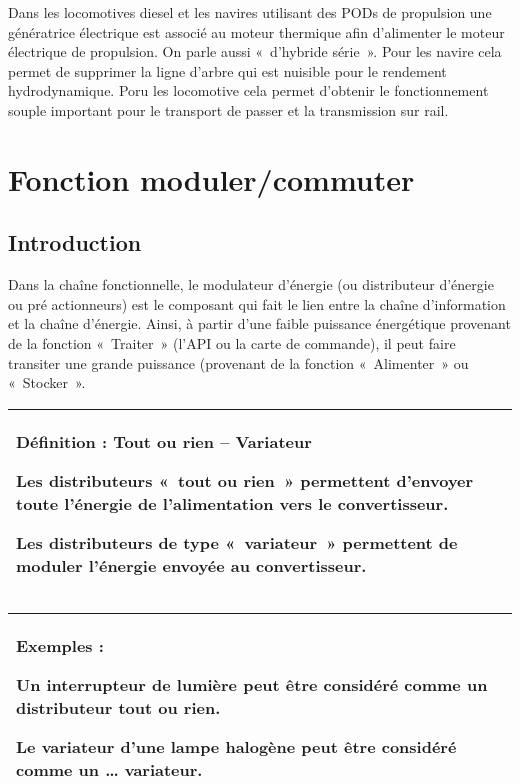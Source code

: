 \documentclass[
]{article}
\begin{document}
Dans les locomotives diesel et les navires utilisant des PODs de
propulsion une génératrice électrique est associé au moteur thermique
afin d'alimenter le moteur électrique de propulsion. On parle aussi
«~d'hybride série~». Pour les navire cela permet de supprimer la ligne
d'arbre qui est nuisible pour le rendement hydrodynamique. Poru les
locomotive cela permet d'obtenir le fonctionnement souple important pour
le transport de passer et la transmission sur rail.

\hypertarget{fonction-modulercommuter}{%
\section{Fonction moduler/commuter}\label{fonction-modulercommuter}}

\hypertarget{introduction}{%
\subsection{Introduction}\label{introduction}}

Dans la chaîne fonctionnelle, le modulateur d'énergie (ou distributeur
d'énergie ou pré actionneurs) est le composant qui fait le lien entre la
chaîne d'information et la chaîne d'énergie. Ainsi, à partir d'une
faible puissance énergétique provenant de la fonction «~Traiter~» (l'API
ou la carte de commande), il peut faire transiter une grande puissance
(provenant de la fonction «~Alimenter~» ou «~Stocker~».

\begin{longtable}[]{@{}
  >{\raggedright\arraybackslash}p{}@{}}
\toprule
\endhead
\textbf{Définition : Tout ou rien -- Variateur}

Les distributeurs «~tout ou rien~» permettent d'envoyer toute l'énergie
de l'alimentation vers le convertisseur.

Les distributeurs de type «~variateur~» permettent de moduler l'énergie
envoyée au convertisseur. \\
\bottomrule
\end{longtable}

\begin{longtable}[]{@{}
  >{\raggedright\arraybackslash}p{}@{}}
\toprule
\endhead
\textbf{Exemples :}

Un interrupteur de lumière peut être considéré comme un distributeur
tout ou rien.

Le variateur d'une lampe halogène peut être considéré comme un \ldots{}
variateur. \\
\bottomrule
\end{longtable}
\end{document}

